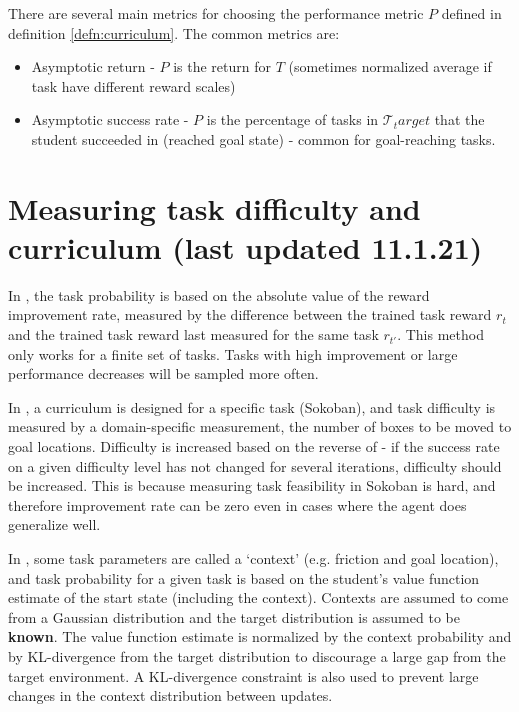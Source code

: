\documentclass[letterpaper]{article}
\theoremstyle{definition}
\begin{document}
There are several main metrics for choosing the performance metric $P$ defined in definition \ref{defn:curriculum}.
The common metrics are:
\begin{itemize}
	\item Asymptotic return - $P$ is the return for $T$ (sometimes normalized average if task have different reward scales)
	\item Asymptotic success rate - $P$ is the percentage of tasks in $\mathcal{T}_target$ that the student succeeded in (reached goal state) - common for goal-reaching tasks.
\end{itemize}


\section{Measuring task difficulty and curriculum (last updated 11.1.21)} \label{sec:difficulty}

In \cite{Matiisen2020}, the task probability is based on the absolute value of the reward improvement rate, measured by the difference between the trained task reward $r_t$ and the trained task reward last measured for the same task $r_{t'}$.
This method only works for a finite set of tasks. Tasks with high improvement or large performance decreases will be sampled more often.

In \cite{Feng2020}, a curriculum is designed for a specific task (Sokoban), and task difficulty is measured by a domain-specific measurement, the number of boxes to be moved to goal locations. Difficulty is increased based on the reverse of \cite{Matiisen2020} - if the success rate on a given difficulty level has not changed for several iterations, difficulty should be increased. This is because measuring task feasibility in Sokoban is hard, and therefore improvement rate can be zero even in cases where the agent does generalize well.

In \cite{Klink2020}, some task parameters are called a `context' (e.g. friction and goal location), and task probability for a given task is based on the student's value function estimate of the start state (including the context).
Contexts are assumed to come from a Gaussian distribution and the target distribution is assumed to be \textbf{known}.
The value function estimate is normalized by the context probability and by KL-divergence from the target distribution to discourage a large gap from the target environment. A KL-divergence constraint is also used to prevent large changes in the context distribution between updates.
\end{document}
